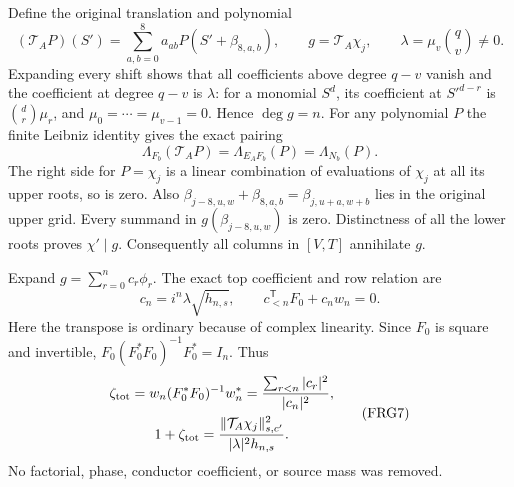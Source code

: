 \documentclass[11pt,a4paper]{article}
\begin{document}
Define the original translation and polynomial
\[
(\mathcal T_AP)(S')=\sum_{a,b=0}^8a_{ab}P(S'+\beta_{8,a,b}),
\qquad g=\mathcal T_A\chi_j,\qquad
\lambda=\mu_v\binom qv\ne0.
\tag{FRG4}
\]
Expanding every shift shows that all coefficients above degree $q-v$
vanish and the coefficient at degree $q-v$ is $\lambda$: for a monomial
$S^d$, its coefficient at $S'^{d-r}$ is $\binom dr\mu_r$, and
$\mu_0=\cdots=\mu_{v-1}=0$. Hence $\deg g=n$.
For any polynomial $P$ the finite Leibniz identity gives the exact pairing
\[
\Lambda_{F_b}(\mathcal T_AP)=\Lambda_{E_AF_b}(P)=\Lambda_{N_b}(P).
\tag{FRG5}
\]
The right side for $P=\chi_j$ is a linear combination of evaluations
of $\chi_j$ at all its upper roots, so is zero. Also
$\beta_{j-8,u,w}+\beta_{8,a,b}=\beta_{j,u+a,w+b}$ lies in the
original upper grid. Every summand in $g(\beta_{j-8,u,w})$ is zero.
Distinctness of all the lower roots proves $\chi'\mid g$.
Consequently all columns in $[V,T]$ annihilate $g$.

Expand $g=\sum_{r=0}^nc_r\phi_r$. The exact top coefficient and row
relation are
\[
c_n=i^n\lambda\sqrt{h_{n,s}},\qquad
c_{<n}^{\mathsf T}F_0+c_nw_n=0.
\tag{FRG6}
\]
Here the transpose is ordinary because of complex linearity.
Since $F_0$ is square and invertible,
$F_0(F_0^*F_0)^{-1}F_0^*=I_n$. Thus
\[
\begin{gathered}
\zeta_{\rm tot}=w_n(F_0^*F_0)^{-1}w_n^*
 =\frac{\sum_{r<n}|c_r|^2}{|c_n|^2},\\
1+\zeta_{\rm tot}
 =\frac{\|\mathcal T_A\chi_j\|_{s,c'}^2}{|\lambda|^2h_{n,s}}.
\end{gathered}\tag{FRG7}
\]
No factorial, phase, conductor coefficient, or source mass was removed.
\end{document}
